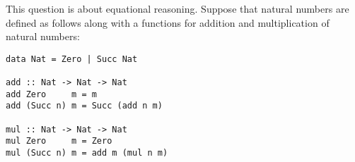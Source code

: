 \allowdisplaybreaks
\question This question is about equational reasoning. Suppose that natural numbers are defined as follows along with a functions for addition and multiplication of natural numbers:
\begin{small}
\begin{verbatim}
data Nat = Zero | Succ Nat

add :: Nat -> Nat -> Nat 
add Zero     m = m 
add (Succ n) m = Succ (add n m)

mul :: Nat -> Nat -> Nat
mul Zero     m = Zero 
mul (Succ n) m = add m (mul n m)
\end{verbatim}
\end{small}


